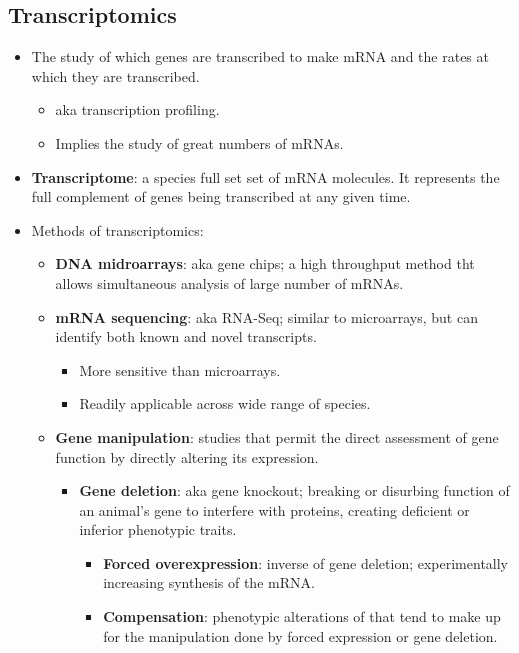 \documentclass[12pt,a4paper]{article}
\begin{document}
\subsection{Transcriptomics}
\begin{itemize}
    \item The study of which genes are transcribed to make mRNA and the rates at which they are transcribed.
        \begin{itemize}
            \item aka transcription profiling.
            \item Implies the 
            study of great numbers of mRNAs.
        \end{itemize}
    \item \textbf{Transcriptome}: a species full set set of mRNA molecules. It represents the full complement of genes being transcribed at any given time.
    \item Methods of transcriptomics:
        \begin{itemize}
            \item \textbf{DNA midroarrays}: aka gene chips; a high throughput method tht allows simultaneous analysis of large number of mRNAs.
            \item \textbf{mRNA sequencing}: aka RNA-Seq; similar to microarrays, but can identify both known and {\color{o-Sun}novel} transcripts.
                \begin{itemize}
                    \item More sensitive than microarrays.
                    \item Readily applicable across wide range of species.
                \end{itemize}
            \item \textbf{Gene manipulation}: studies that permit the direct assessment of gene function by directly altering its expression.
                \begin{itemize}
                    \item \textbf{Gene deletion}: aka gene knockout; breaking or disurbing function of an animal's gene to interfere with proteins, creating deficient or inferior phenotypic traits.
                    \begin{itemize}
                        \item \textbf{Forced overexpression}: inverse of gene deletion; experimentally increasing synthesis of the mRNA.
                        \item \textbf{Compensation}: phenotypic alterations of that tend to make up for the manipulation done by forced expression or gene deletion.

\end{itemize}
\end{itemize}
\end{itemize}
\end{itemize}
\end{document}
